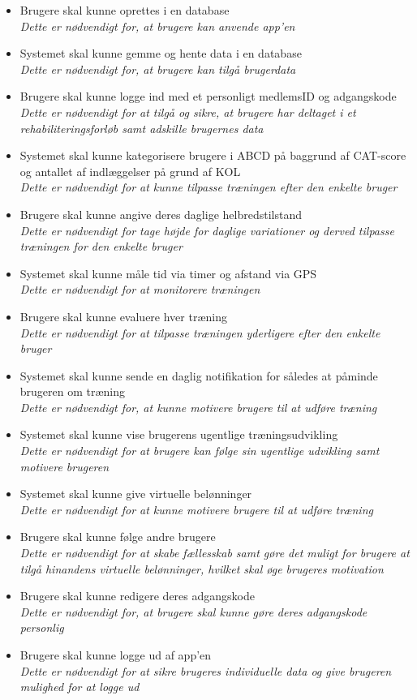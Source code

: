 \noindent 
\begin{itemize}
\item Brugere skal kunne oprettes i en database
	\\
	\textit{Dette er nødvendigt for, at brugere kan anvende app'en}
	\item Systemet skal kunne gemme og hente data i en database
\\
\textit{Dette er nødvendigt for, at brugere kan tilgå brugerdata}
\item Brugere skal kunne logge ind med et personligt medlemsID og adgangskode
	\\
	\textit{Dette er nødvendigt for at tilgå og sikre, at brugere har deltaget i et rehabiliteringsforløb samt adskille brugernes data}
\item Systemet skal kunne kategorisere brugere i ABCD på baggrund af CAT-score og  antallet af indlæggelser på grund af KOL
	\\
	\textit{Dette er nødvendigt for at kunne tilpasse træningen efter den enkelte bruger}
\item Brugere skal kunne angive deres daglige helbredstilstand 
	\\
\textit{Dette er nødvendigt for tage højde for daglige variationer og derved tilpasse træningen for den enkelte bruger}
\item Systemet skal kunne måle tid via timer og afstand via GPS
	\\
\textit{Dette er nødvendigt for at monitorere træningen}
\item Brugere skal kunne evaluere hver træning
	\\
\textit{Dette er nødvendigt for at tilpasse træningen yderligere efter den enkelte bruger}		
\item Systemet skal kunne sende en daglig notifikation for således at påminde brugeren om træning
	\\
	\textit{Dette er nødvendigt for, at kunne motivere brugere til at udføre træning}
\item Systemet skal kunne vise brugerens ugentlige træningsudvikling
\\
\textit{Dette er nødvendigt for at brugere kan følge sin ugentlige udvikling samt motivere brugeren}	
	\item Systemet skal kunne give virtuelle belønninger 
	\\
	\textit{Dette er nødvendigt for at kunne motivere brugere til at udføre træning}
\item Brugere skal kunne følge andre brugere 
	\\
	\textit{Dette er nødvendigt for at skabe fællesskab samt gøre det muligt for brugere at tilgå hinandens virtuelle belønninger, hvilket skal øge brugeres motivation}
\item Brugere skal kunne redigere deres adgangskode
	\\
	\textit{Dette er nødvendigt for, at brugere skal kunne gøre deres adgangskode personlig}
\item Brugere skal kunne logge ud af app'en
	\\
	\textit{Dette er nødvendigt for at sikre brugeres individuelle data og give brugeren mulighed for at logge ud}
\end{itemize}


